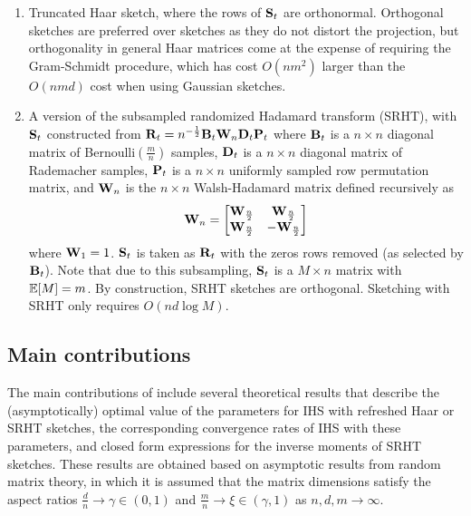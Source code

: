 \begin{enumerate}

\item
Truncated Haar sketch, where the rows of $\mathbf{S}_t$ are orthonormal. Orthogonal sketches are preferred over \iid sketches as they do not distort the projection, but orthogonality in general Haar matrices come at the expense of requiring the Gram-Schmidt procedure, which has cost $O(nm^2)$ larger than the $O(nmd)$ cost when using Gaussian sketches.

\item
A version of the subsampled randomized Hadamard transform (SRHT), with $\mathbf{S}_t$ constructed from $\mathbf{R}_t=n^{-\frac{1}{2}}\mathbf{B}_t\mathbf{W}_n\mathbf{D}_t\mathbf{P}_t$ where $\mathbf{B}_t$ is a $n\times n$ diagonal matrix of \iid Bernoulli$\left(\frac{m}{n}\right)$ samples, $\mathbf{D}_t$ is a $n\times n$ diagonal matrix of \iid Rademacher samples, $\mathbf{P}_t$ is a $n\times n$ uniformly sampled row permutation matrix, and $\mathbf{W}_n$ is the $n\times n$ Walsh-Hadamard matrix defined recursively as
\[
\mathbf{W}_n =
\begin{bmatrix}
\mathbf{W}_\frac{n}{2} & \mathbf{W}_\frac{n}{2} \\
\mathbf{W}_\frac{n}{2} & -\mathbf{W}_\frac{n}{2}
\end{bmatrix}
\]
where $\mathbf{W}_1=1$. $\mathbf{S}_t$ is taken as $\mathbf{R}_t$ with the zeros rows removed (as selected by $\mathbf{B}_t$). Note that due to this subsampling, $\mathbf{S}_t$ is a $M\times n$ matrix with $\mathbb{E}[M]=m$. By construction, SRHT sketches are orthogonal. Sketching with SRHT only requires $O(nd\log M)$.

\end{enumerate}


\subsection{Main contributions}

The main contributions of \citet{Lacotte:2020} include several theoretical results that describe the (asymptotically) optimal value of the parameters for IHS with refreshed Haar or SRHT sketches, the corresponding convergence rates of IHS with these parameters, and closed form expressions for the inverse moments of SRHT sketches. These results are obtained based on asymptotic results from random matrix theory, in which it is assumed that the matrix dimensions satisfy the aspect ratios $\frac{d}{n}\rightarrow\gamma\in(0,1)$ and $\frac{m}{n}\rightarrow\xi\in(\gamma,1)$ as $n,d,m\rightarrow\infty$.
\\

